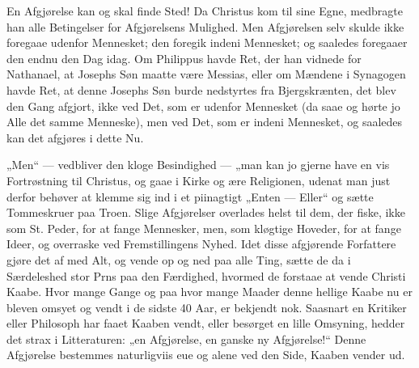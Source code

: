 \documentclass[12pt,a4paper]{book}
\begin{document}
En Afgjørelse kan og skal finde Sted! Da Christus kom til sine Egne, medbragte han alle
Betingelser for Afgjørelsens Mulighed. Men Afgjørelsen selv skulde ikke foregaae udenfor
Mennesket; den foregik indeni Mennesket; og saaledes foregaaer den endnu den Dag idag. Om
Philippus havde Ret, der han vidnede for
Nathanael, at Josephs Søn maatte være Messias, eller om Mændene i Synagogen
havde Ret, at denne Josephs Søn burde nedstyrtes fra Bjergskrænten, det blev den
Gang afgjort, ikke ved Det, som er udenfor Mennesket (da saae og hørte jo Alle
det samme Menneske), men ved Det, som er indeni Mennesket, og saaledes kan det
afgjøres i dette Nu.

„Men“ --- vedbliver den kloge Besindighed --- „man kan jo gjerne have en vis
Fortrøstning til Christus, og gaae i Kirke og ære Religionen, udenat man just
derfor behøver at klemme sig ind i et piinagtigt „Enten --- Eller“ og sætte
Tommeskruer paa Troen. Slige Afgjørelser overlades helst til dem, der fiske,
ikke som St. Peder, for at fange Mennesker, men, som kløgtige Hoveder, for at
fange Ideer, og overraske ved Fremstillingens Nyhed. Idet disse afgjørende
Forfattere gjøre det af med Alt, og vende op og ned paa alle Ting, sætte de da i
Særdeleshed stor
Prns paa den Færdighed, hvormed de forstaae at vende Christi
Kaabe. Hvor mange Gange og paa hvor mange Maader denne hellige Kaabe nu er
bleven omsyet og vendt i de sidste 40 Aar, er bekjendt nok. Saasnart en Kritiker
eller Philosoph har faaet Kaaben vendt, eller besørget en lille Omsyning, hedder
det
strax i Litteraturen: „en Afgjørelse, en ganske ny Afgjørelse!“ Denne
Afgjørelse bestemmes naturligviis
eue og alene ved den Side, Kaaben vender ud.
\end{document}
